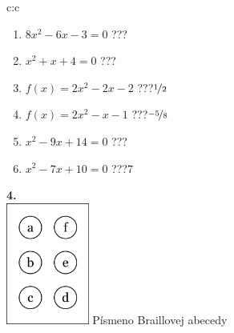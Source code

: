 \documentclass[10pt]{report}
\begin{document}
\begin{tabular}{c:c}
\begin{minipage}[c][104.5mm][t]{0.5\linewidth}
\begin{center}
\begin{minipage}{0.79\linewidth}
\begin{center}
\begin{varwidth}{\linewidth}
\begin{enumerate}
\Large
\item $8x^2-6x-3=0$\quad \dotfill\; ???\;\dotfill {}
\item $x^2+x+4=0$\quad \dotfill\; ???\;\dotfill {}
\item $f(x)=2x^2-2x-2$\quad \dotfill\; ???\;\dotfill \quad $\nicefrac{1}{2}$
\item $f(x)=2x^2-x-1$\quad \dotfill\; ???\;\dotfill \quad $\nicefrac{-5}{8}$
\item $x^2-9x+14=0$\quad \dotfill\; ???\;\dotfill {}
\item $x^2-7x+10=0$\quad \dotfill\; ???\;\dotfill \quad $7$
\end{enumerate}
\end{varwidth}
\end{center}
\end{minipage}
\begin{minipage}{0.20\linewidth}
\begin{center}
{\Huge\bfseries 4.} \\[2mm]
\includegraphics[height=40mm]{../images/braille.png}
{\small Písmeno Braillovej abecedy}
\end{center}
\end{minipage}
\end{center}
\end{minipage}
%
\end{tabular}
\newpage
\thispagestyle{empty}
\end{document}

